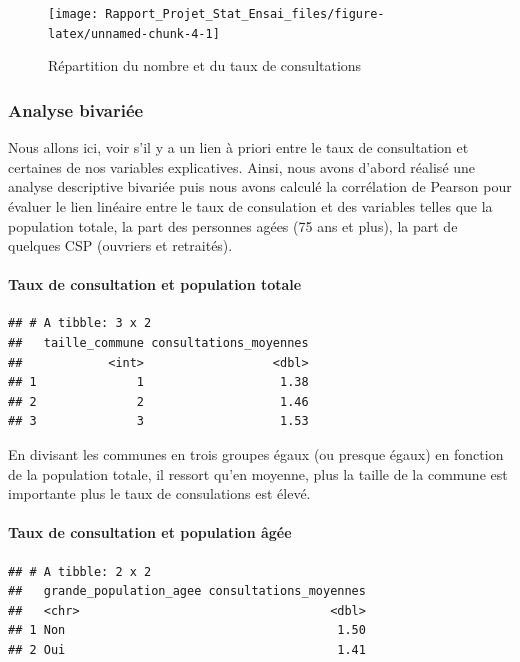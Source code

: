 \documentclass[
]{article}
\begin{document}
\begin{figure}

{\centering \texttt{[image: Rapport\_Projet\_Stat\_Ensai\_files/figure-latex/unnamed-chunk-4-1]} 

}

\caption{Répartition du nombre et du taux de consultations}\label{fig:unnamed-chunk-4}
\end{figure}

\subsubsection{Analyse bivariée}\label{analyse-bivariuxe9e}

Nous allons ici, voir s'il y a un lien à priori entre le taux de
consultation et certaines de nos variables explicatives. Ainsi, nous
avons d'abord réalisé une analyse descriptive bivariée puis nous avons
calculé la corrélation de Pearson pour évaluer le lien linéaire entre le
taux de consulation et des variables telles que la population totale, la
part des personnes agées (75 ans et plus), la part de quelques CSP
(ouvriers et retraités).

\paragraph{Taux de consultation et population
totale}\label{taux-de-consultation-et-population-totale}

\begin{verbatim}
## # A tibble: 3 x 2
##   taille_commune consultations_moyennes
##            <int>                  <dbl>
## 1              1                   1.38
## 2              2                   1.46
## 3              3                   1.53
\end{verbatim}

En divisant les communes en trois groupes égaux (ou presque égaux) en
fonction de la population totale, il ressort qu'en moyenne, plus la
taille de la commune est importante plus le taux de consulations est
élevé.

\paragraph{Taux de consultation et population
âgée}\label{taux-de-consultation-et-population-uxe2guxe9e}

\begin{verbatim}
## # A tibble: 2 x 2
##   grande_population_agee consultations_moyennes
##   <chr>                                   <dbl>
## 1 Non                                      1.50
## 2 Oui                                      1.41
\end{verbatim}
\end{document}
